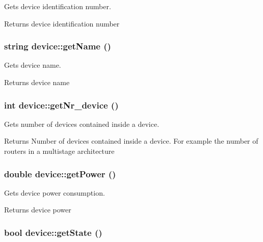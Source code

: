 Gets device identification number. 

\begin{DoxyReturn}{Returns}
device identification number 
\end{DoxyReturn}
\hypertarget{classdevice_a9dc7119476febd7ba47060d74ba37e20}{
\subsubsection[{getName}]{\setlength{\rightskip}{0pt plus 5cm}string device::getName ()}}
\label{classdevice_a9dc7119476febd7ba47060d74ba37e20}


Gets device name. 

\begin{DoxyReturn}{Returns}
device name 
\end{DoxyReturn}
\hypertarget{classdevice_aba1387d01eac1fa58a5386395b368384}{
\subsubsection[{getNr\_\-device}]{\setlength{\rightskip}{0pt plus 5cm}int device::getNr\_\-device ()}}
\label{classdevice_aba1387d01eac1fa58a5386395b368384}


Gets number of devices contained inside a device. 

\begin{DoxyReturn}{Returns}
Number of devices contained inside a device. For example the number of routers in a multistage architecture 
\end{DoxyReturn}
\hypertarget{classdevice_af7b6d78ad457ad75a5f3ed2b40266017}{
\subsubsection[{getPower}]{\setlength{\rightskip}{0pt plus 5cm}double device::getPower ()}}
\label{classdevice_af7b6d78ad457ad75a5f3ed2b40266017}


Gets device power consumption. 

\begin{DoxyReturn}{Returns}
device power 
\end{DoxyReturn}
\hypertarget{classdevice_a287ef719b436c552cb78f498869ce590}{
\subsubsection[{getState}]{\setlength{\rightskip}{0pt plus 5cm}bool device::getState ()}}
\label{classdevice_a287ef719b436c552cb78f498869ce590}



